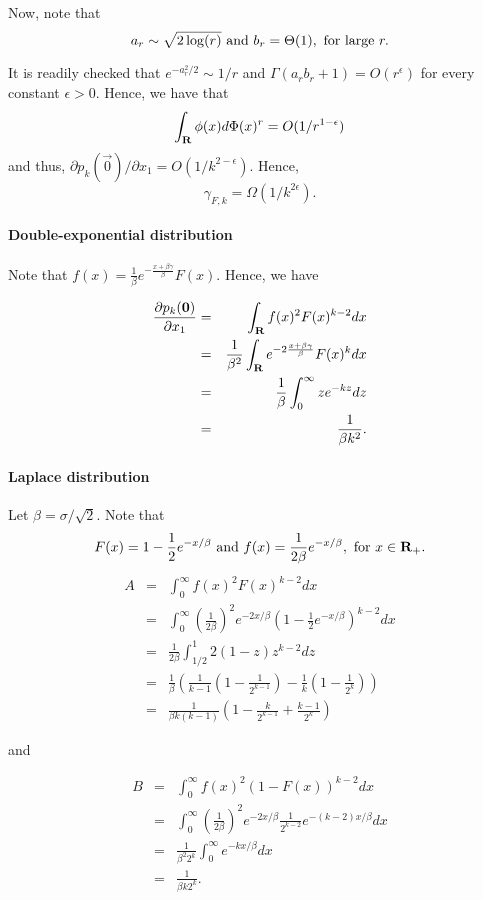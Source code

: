 Now, note that
$$
a_r \sim \sqrt{2\log(r)} \hbox{ and } b_r = \Theta(1), \hbox{ for large } r.
$$

It is readily checked that $e^{-a_r^2/2} \sim 1/r$ and $\Gamma(a_r b_r + 1) = O(r^\epsilon)$ for every constant $\epsilon > 0$. Hence, we have that
$$
\int_{\mathbf{R}} \phi(x) d\Phi(x)^r = O(1/r^{1-\epsilon})
$$
and thus, $\partial p_k(\vec{0})/\partial x_1 = O(1/k^{2-\epsilon})$. Hence,
$$
\gamma_{F,k} = \Omega(1/k^{2\epsilon}).
$$

\paragraph{Double-exponential distribution} Note that $f(x) = \frac{1}{\beta} e^{-\frac{x + \beta \gamma}{\beta}} F(x)$. Hence, we have

\begin{eqnarray*}
\frac{\partial p_k(\mathbf{0})}{\partial x_1} &=& \int_{\mathbf{R}} f(x)^2 F(x)^{k-2}dx\\
&=& \frac{1}{\beta^2}\int_{\mathbf{R}} e^{-2\frac{x+\beta\gamma}{\beta}} F(x)^k dx\\
&=& \frac{1}{\beta} \int_0^\infty z e^{-k z}dz\\
&=& \frac{1}{\beta k^2}.
\end{eqnarray*}

\paragraph{Laplace distribution} Let $\beta = \sigma / \sqrt{2}$. Note that 
$$
F(x) = 1-\frac{1}{2}e^{-x/\beta} \hbox{ and } f(x) = \frac{1}{2\beta} e^{-x/\beta}, \hbox{ for } x\in \mathbf{R}_+.
$$
\begin{eqnarray*}
A &=& \int_0^\infty f(x)^2 F(x)^{k-2}dx\\
&=& \int_0^\infty \left(\frac{1}{2\beta}\right)^2 e^{-2x/\beta} \left(1-\frac{1}{2}e^{-x/\beta}\right)^{k-2} dx\\
&=& \frac{1}{2\beta} \int_{1/2}^1 2(1-z) z^{k-2} dz\\
&=& \frac{1}{\beta} \left(\frac{1}{k-1}\left(1-\frac{1}{2^{k-1}}\right) - \frac{1}{k}\left(1-\frac{1}{2^{k}}\right)\right)\\
&=& \frac{1}{\beta k(k-1)}\left(1-\frac{k}{2^{k-1}} + \frac{k-1}{2^k}\right)
\end{eqnarray*}

and

\begin{eqnarray*}
B &=& \int_0^\infty f(x)^2 (1-F(x))^{k-2}dx\\
&=& \int_0^\infty \left(\frac{1}{2\beta}\right)^2 e^{-2x/\beta} \frac{1}{2^{k-2}}e^{-(k-2)x/\beta} dx\\
&=& \frac{1}{\beta^2 2^k} \int_0^\infty e^{-kx/\beta}dx\\
&=& \frac{1}{\beta k 2^k}.
\end{eqnarray*}

